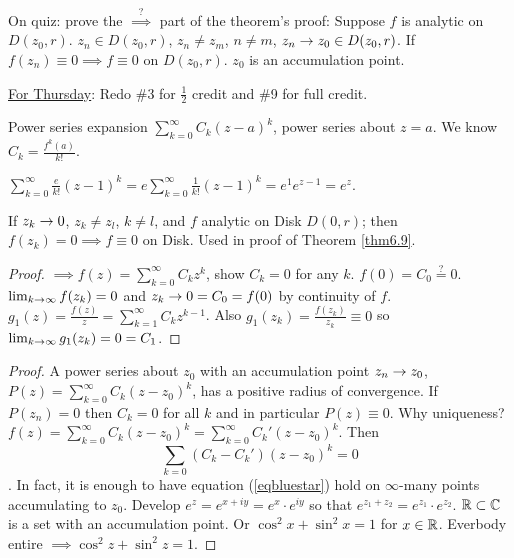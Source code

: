 \documentclass[]{article}
\begin{document}
On quiz: prove the $\overset{?}{\implies}$ part of the theorem's proof: Suppose $f$ is analytic on $D(z_0,r)$. $z_n\in D(z_0,r)$, $z_n\neq z_m$, $n\neq m$, $z_n\rightarrow z_0 \in D(z_0,r)$. If $f(z_n)\equiv 0 \implies f\equiv 0$ on $D(z_0,r)$. $z_0$ is an accumulation point.

\underline{For Thursday}: Redo \#3 for $\frac{1}{2}$ credit and \#9 for full credit.

Power series expansion $\sum_{k=0}^\infty C_k(z-a)^k$, power series about $z=a$. We know $C_k = \frac{f^k(a)}{k!}$.
\begin{example}
	 $\sum_{k=0}^\infty \frac{e}{k!}(z-1)^k = e\sum_{k=0}^\infty \frac{1}{k!}(z-1)^k = e^1e^{z-1} = e^z$.
\end{example}
\begin{recall}
	[p.31 Theorem 2.12] If $z_k \rightarrow 0$, $z_k\neq z_l$, $k\neq l$, and $f$ analytic on Disk $D(0,r)$; then $f(z_k)=0 \implies f\equiv 0$ on Disk. Used in proof of Theorem \ref{thm6.9}.
\end{recall}
\begin{proof}
	$\implies f(z) = \sum_{k=0}^\infty C_k z^k$, show $C_k=0$ for any $k$. $f(0) = C_0 \overset{?}{=} 0$. $\lim_{k\rightarrow \infty} f(z_k) = 0$ and $z_k\rightarrow 0 = C_0 = f(0)$ by continuity of $f$. $g_1(z) = \frac{f(z)}{z} = \sum_{k=1}^\infty C_k z^{k-1}$. Also $g_1(z_k) = \frac{f(z_k)}{z_k} \equiv 0$ so $\lim_{k\rightarrow \infty} g_1(z_k) = 0 = C_1$.
\end{proof}

\begin{proof}
	A power series about $z_0$ with an accumulation point $z_n \rightarrow z_0$, $P(z) = \sum_{k=0}^\infty C_k(z-z_0)^k$, has a positive radius of convergence. If $P(z_n) = 0$ then $C_k = 0$ for all $k$ and in particular $P(z) \equiv 0$.
	Why uniqueness? $f(z) = \sum_{k=0}^\infty C_k(z-z_0)^k = \sum_{k=0}^\infty C_k'(z-z_0)^k$. Then \begin{equation}
	\sum_{k=0}(C_k-C_k')(z-z_0)^k = 0
	\label{eqbluestar}
	\end{equation}. In fact, it is enough to have equation (\ref{eqbluestar}) hold on $\infty$-many points accumulating to $z_0$. Develop $e^z = e^{x+iy} = e^x \cdot e^{iy}$ so that $e^{z_1+z_2} = e^{z_1}\cdot e^{z_2}$. $\mathbb{R}\subset \mathbb{C}$ is a set with an accumulation point. Or $\cos^2{x} + \sin^2{x} = 1$ for $x\in \mathbb{R}$. Everbody entire $\implies \cos^2{z} + \sin^2{z} = 1$.
\end{proof}
\end{document}
